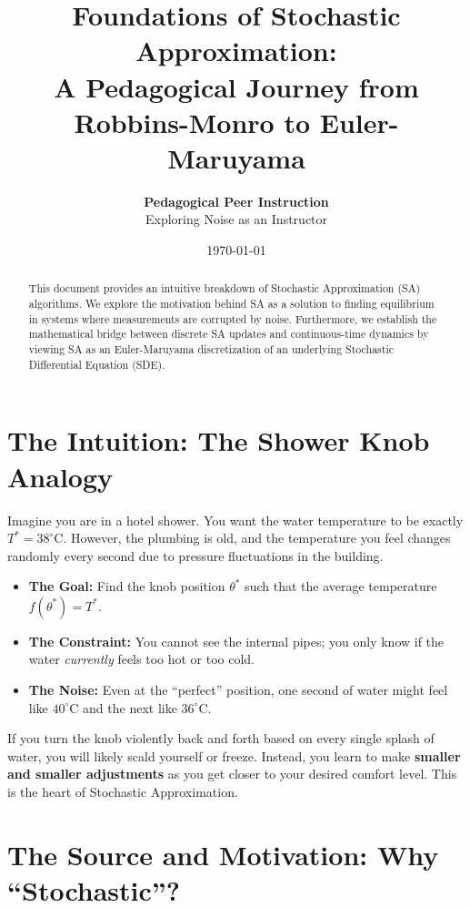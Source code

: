\documentclass[11pt]{article}
\title{\textbf{Foundations of Stochastic Approximation: \\ A Pedagogical Journey from Robbins-Monro to Euler-Maruyama}}
\author{\textbf{Pedagogical Peer Instruction} \\ Exploring Noise as an Instructor}
\date{\today}
\begin{document}
\maketitle

\begin{abstract}
This document provides an intuitive breakdown of Stochastic Approximation (SA) algorithms. We explore the motivation behind SA as a solution to finding equilibrium in systems where measurements are corrupted by noise. Furthermore, we establish the mathematical bridge between discrete SA updates and continuous-time dynamics by viewing SA as an Euler-Maruyama discretization of an underlying Stochastic Differential Equation (SDE).
\end{abstract}

\section{The Intuition: The Shower Knob Analogy}

Imagine you are in a hotel shower. You want the water temperature to be exactly $T^* = 38^\circ\text{C}$. However, the plumbing is old, and the temperature you feel changes randomly every second due to pressure fluctuations in the building.

\begin{itemize}
    \item \textbf{The Goal:} Find the knob position $\theta^*$ such that the average temperature $f(\theta^*) = T^*$.
    \item \textbf{The Constraint:} You cannot see the internal pipes; you only know if the water \textit{currently} feels too hot or too cold.
    \item \textbf{The Noise:} Even at the ``perfect'' position, one second of water might feel like $40^\circ\text{C}$ and the next like $36^\circ\text{C}$.
\end{itemize}

If you turn the knob violently back and forth based on every single splash of water, you will likely scald yourself or freeze. Instead, you learn to make \textbf{smaller and smaller adjustments} as you get closer to your desired comfort level. This is the heart of Stochastic Approximation.

\section{The Source and Motivation: Why ``Stochastic''?}
\end{document}
